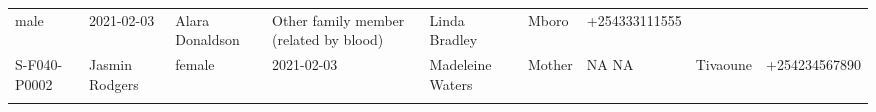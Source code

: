 \documentclass[
]{article}
\begin{document}
\begin{longtable}[]{@{}lllllllll@{}}
\begin{minipage}[t]{0.04\columnwidth}
male\strut
\end{minipage} & \begin{minipage}[t]{0.06\columnwidth}\raggedright
2021-02-03\strut
\end{minipage} & \begin{minipage}[t]{0.09\columnwidth}\raggedright
Alara Donaldson\strut
\end{minipage} & \begin{minipage}[t]{0.20\columnwidth}\raggedright
Other family member (related by blood)\strut
\end{minipage} & \begin{minipage}[t]{0.07\columnwidth}\raggedright
Linda Bradley\strut
\end{minipage} & \begin{minipage}[t]{0.07\columnwidth}\raggedright
Mboro\strut
\end{minipage} & \begin{minipage}[t]{0.07\columnwidth}\raggedright
+254333111555\strut
\end{minipage}\tabularnewline
\begin{minipage}[t]{0.07\columnwidth}\raggedright
S-F040-P0002\strut
\end{minipage} & \begin{minipage}[t]{0.09\columnwidth}\raggedright
Jasmin Rodgers\strut
\end{minipage} & \begin{minipage}[t]{0.04\columnwidth}\raggedright
female\strut
\end{minipage} & \begin{minipage}[t]{0.06\columnwidth}\raggedright
2021-02-03\strut
\end{minipage} & \begin{minipage}[t]{0.09\columnwidth}\raggedright
Madeleine Waters\strut
\end{minipage} & \begin{minipage}[t]{0.20\columnwidth}\raggedright
Mother\strut
\end{minipage} & \begin{minipage}[t]{0.07\columnwidth}\raggedright
NA NA\strut
\end{minipage} & \begin{minipage}[t]{0.07\columnwidth}\raggedright
Tivaoune\strut
\end{minipage} & \begin{minipage}[t]{0.07\columnwidth}\raggedright
+254234567890\strut
\end{minipage}\tabularnewline
\begin{minipage}[t]{0.07\columnwidth}\raggedright

\end{minipage}
\end{longtable}
\end{document}
